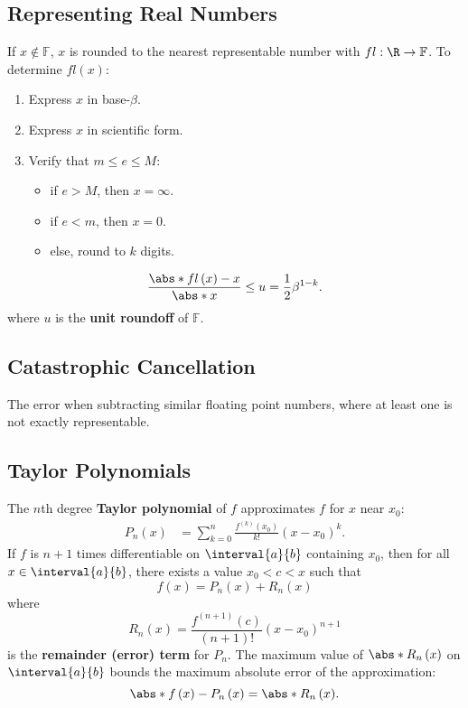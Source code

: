 \documentclass{article}
\begin{document}
\begin{multicols}{3}
    \subsection{Representing Real Numbers}
    If \(x \notin \mathbb{F}\), \(x\) is rounded to the nearest representable number
    with \(fl : \R \to \mathbb{F}\). To determine \(fl\left( x \right)\):
    \begin{enumerate}
        \item Express \(x\) in base-\(\beta\).
        \item Express \(x\) in scientific form.
        \item Verify that \(m \leq e \leq M\):
              \begin{itemize}
                  \item if \(e > M\), then \(x = \infty\).
                  \item if \(e < m\), then \(x = 0\).
                  \item else, round to \(k\) digits.
              \end{itemize}
    \end{enumerate}
    \begin{equation*}
        \frac{\abs*{fl\left( x \right) - x}}{\abs*{x}} \leq u = \frac{1}{2} \beta^{1 - k}.
    \end{equation*}
    where \(u\) is the \textbf{unit roundoff}  of \(\mathbb{F}\).
    \subsection{Catastrophic Cancellation}
    The error when subtracting similar floating
    point numbers, where at least one is not exactly representable.
    \subsection{Taylor Polynomials}
    The \(n\)th degree \textbf{Taylor polynomial} of \(f\)
    approximates \(f\) for \(x\) near \(x_0\):
    \begin{align*}
        P_n\left( x \right) & = \sum_{k = 0}^n \frac{f^{\left( k \right)}\left( x_0 \right)}{k!} \left( x - x_0 \right)^k.
    \end{align*}
    If \(f\) is \(n + 1\) times differentiable on \(\interval{a}{b}\) containing \(x_0\),
    then for all \(x \in \interval{a}{b}\),
    there exists a value \(x_0 < c < x\) such that
    \begin{equation*}
        f\left( x \right) = P_n\left( x \right) + R_n\left( x \right)
    \end{equation*}
    where
    \begin{equation*}
        R_n\left( x \right) = \frac{f^{\left( n + 1 \right)}\left( c \right)}{\left( n + 1 \right)!} \left( x - x_0 \right)^{n + 1}
    \end{equation*}
    is the \textbf{remainder (error) term} for \(P_n\).
    The maximum value of \(\abs*{R_n\left( x \right)}\) on \(\interval{a}{b}\) bounds the maximum absolute error of the approximation:
    \begin{equation*}
        \abs*{f\left( x \right) - P_n\left( x \right)} = \abs*{R_n\left( x \right)}.
    \end{equation*}

\end{multicols}
\end{document}
